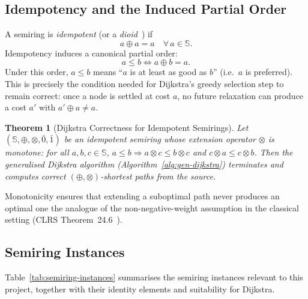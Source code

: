 \documentclass[12pt,a4paper]{article}
\newtheorem{theorem}{Theorem}[section]
\newcommand{\SR}{\mathbb{S}}
\newcommand{\Rzero}{\bar{0}}
\newcommand{\Rone}{\bar{1}}
\newcommand{\opl}{\oplus}
\newcommand{\otm}{\otimes}
\begin{document}
\subsection{Idempotency and the Induced Partial Order}

A semiring is \emph{idempotent} (or a \emph{dioid}~\cite{gondran2008}) if
\[
  a \opl a = a \quad \forall\, a \in \SR.
\]
Idempotency induces a canonical partial order:
\[
  a \leq b \iff a \opl b = a.
\]
Under this order, $a \leq b$ means ``$a$ is at least as good as $b$'' (i.e.\
$a$ is preferred).  This is precisely the condition needed for Dijkstra's
greedy selection step to remain correct: once a node is settled at cost $a$,
no future relaxation can produce a cost $a'$ with $a' \opl a \neq a$.

\begin{theorem}[Dijkstra Correctness for Idempotent Semirings]
  Let $(\SR, \opl, \otm, \Rzero, \Rone)$ be an idempotent semiring whose
  extension operator $\otm$ is \emph{monotone}: for all $a, b, c \in \SR$,
  $a \leq b \Rightarrow a \otm c \leq b \otm c$ and
  $c \otm a \leq c \otm b$.  Then the generalised Dijkstra algorithm
  (Algorithm~\ref{alg:gen-dijkstra}) terminates and computes correct
  $(\opl, \otm)$-shortest paths from the source.
\end{theorem}

Monotonicity ensures that extending a suboptimal path never produces an
optimal one  the analogue of the non-negative-weight assumption in the
classical setting (CLRS Theorem~24.6~\cite{clrs}).

\subsection{Semiring Instances}
\label{subsec:semiring-instances}

Table~\ref{tab:semiring-instances} summarises the semiring instances
relevant to this project, together with their identity elements and
suitability for Dijkstra.
\end{document}
